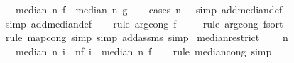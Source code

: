 \begin{isabellebody}
\ \ \ {\isachardoublequoteopen}median\ n\ f\ {\isacharequal}{\kern0pt}\ median\ n\ g{\isachardoublequoteclose}\isanewline
%
\isadelimproof
\ \ %
\endisadelimproof
%
\isatagproof
{}\isamarkupfalse%
\ {\isacharparenleft}{\kern0pt}cases\ {\isachardoublequoteopen}n\ {\isacharequal}{\kern0pt}\ {}{\isachardoublequoteclose}{\isacharcomma}{\kern0pt}\ simp\ add{\isacharcolon}{\kern0pt}median{\isacharunderscore}{\kern0pt}def{\isacharparenright}{\kern0pt}\isanewline
\ \ \isamarkupfalse%
\ {\isacharparenleft}{\kern0pt}simp\ add{\isacharcolon}{\kern0pt}median{\isacharunderscore}{\kern0pt}def{\isacharparenright}{\kern0pt}\isanewline
\ \ \isamarkupfalse%
\ {\isacharparenleft}{\kern0pt}rule\ arg{\isacharunderscore}{\kern0pt}cong{}{\isacharbrackleft}{\kern0pt}\ f{\isacharequal}{\kern0pt}{\isachardoublequoteopen}{\isacharparenleft}{\kern0pt}{\isacharbang}{\kern0pt}{\isacharparenright}{\kern0pt}{\isachardoublequoteclose}{\isacharbrackright}{\kern0pt}{\isacharparenright}{\kern0pt}\isanewline
\ \ \ \isamarkupfalse%
\ {\isacharparenleft}{\kern0pt}rule\ arg{\isacharunderscore}{\kern0pt}cong{\isacharbrackleft}{\kern0pt}\ f{\isacharequal}{\kern0pt}{\isachardoublequoteopen}sort{\isachardoublequoteclose}{\isacharbrackright}{\kern0pt}{\isacharparenright}{\kern0pt}\isanewline
\ \ \isamarkupfalse%
\ {\isacharparenleft}{\kern0pt}rule\ map{\isacharunderscore}{\kern0pt}cong{\isacharcomma}{\kern0pt}\ simp{\isacharcomma}{\kern0pt}\ simp\ add{\isacharcolon}{\kern0pt}assms{\isacharcomma}{\kern0pt}\ simp{\isacharparenright}{\kern0pt}%
\endisatagproof
{\isafoldproof}%
%
\isadelimproof
\isanewline
%
\endisadelimproof
\isanewline
{}\isamarkupfalse%
\ median{\isacharunderscore}{\kern0pt}restrict{\isacharcolon}{\kern0pt}\ \isanewline
\ \ \ {\isachardoublequoteopen}n\ {\isachargreater}{\kern0pt}\ {}{\isachardoublequoteclose}\isanewline
\ \ \ {\isachardoublequoteopen}median\ n\ {\isacharparenleft}{\kern0pt}{\isasymlambda}i\ {\isasymin}\ {\isacharbraceleft}{\kern0pt}{}{\isachardot}{\kern0pt}{\isachardot}{\kern0pt}{\isacharless}{\kern0pt}n{\isacharbraceright}{\kern0pt}{\isachardot}{\kern0pt}f\ i{\isacharparenright}{\kern0pt}\ {\isacharequal}{\kern0pt}\ median\ n\ f{\isachardoublequoteclose}\isanewline
%
\isadelimproof
\ \ %
\endisadelimproof
%
\isatagproof
{}\isamarkupfalse%
\ {\isacharparenleft}{\kern0pt}rule\ median{\isacharunderscore}{\kern0pt}cong{\isacharcomma}{\kern0pt}\ simp{\isacharparenright}{\kern0pt}%

\end{isabellebody}
